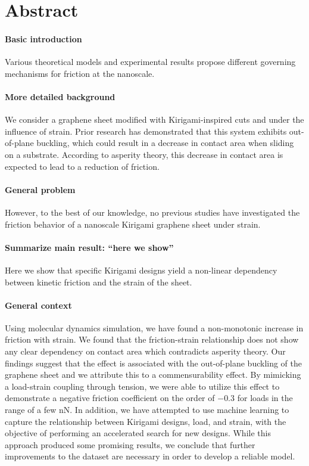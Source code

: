 \chapter*{Abstract} 


\subsubsection*{Basic introduction}
Various theoretical models and experimental results propose different governing mechanisms for friction at the nanoscale.


\subsubsection*{More detailed background}

We consider a graphene sheet modified with Kirigami-inspired cuts and under the influence of strain. Prior research has demonstrated that this system exhibits out-of-plane buckling, which could result in a decrease in contact area when sliding on a substrate. According to asperity theory, this decrease in contact area is expected to lead to a reduction of friction.


\subsubsection*{General problem}
However, to the best of our knowledge, no previous studies have investigated the friction behavior of a nanoscale Kirigami graphene sheet under strain. 


\subsubsection*{Summarize main result: ``here we show''}
Here we show that specific Kirigami designs yield a non-linear dependency between kinetic friction and the strain of the sheet.


\subsubsection*{General context}
Using molecular dynamics simulation, we have found a non-monotonic increase in friction with strain. We found that the friction-strain relationship does not show any clear dependency on contact area which contradicts asperity theory. Our findings suggest that the effect is associated with the out-of-plane buckling of the graphene sheet and we attribute this to a commensurability effect. By mimicking a load-strain coupling through tension, we were able to utilize this effect to demonstrate a negative friction coefficient on the order of $-0.3$ for loads in the range of a few nN. In addition, we have attempted to use machine learning to capture the relationship between Kirigami designs, load, and strain, with the objective of performing an accelerated search for new designs. While this approach produced some promising results, we conclude that further improvements to the dataset are necessary in order to develop a reliable model.

